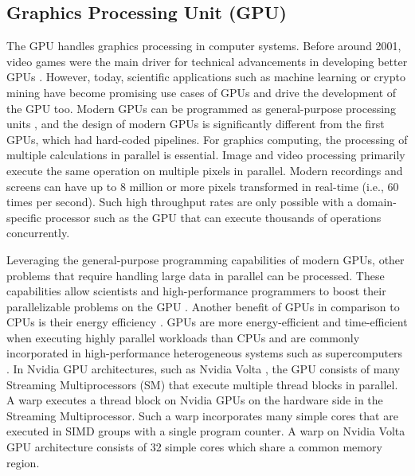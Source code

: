 \subsection{Graphics Processing Unit (GPU)}
The GPU handles graphics processing in computer systems. Before around 2001, video games were the main driver for technical advancements in developing better GPUs \cite{vuducBriefHistoryIntroduction2013}. However, today, scientific applications such as machine learning or crypto mining have become promising use cases of GPUs and drive the development of the GPU too. Modern GPUs can be programmed as general-purpose processing units \cite{nickollsGPUComputingEra2010}, and the design of modern GPUs is significantly different from the first GPUs, which had hard-coded pipelines. For graphics computing, the processing of multiple calculations in parallel is essential. Image and video processing primarily execute the same operation on multiple pixels in parallel. Modern recordings and screens can have up to 8 million or more pixels transformed in real-time (i.e., 60 times per second). Such high throughput rates are only possible with a domain-specific processor such as the GPU that can execute thousands of operations concurrently.

Leveraging the general-purpose programming capabilities of modern GPUs, other problems that require handling large data in parallel can be processed. These capabilities allow scientists and high-performance programmers to boost their parallelizable problems on the GPU \cite{cohenSolvingComputationalProblems2009,nickollsScalableParallelProgramming2008,stoneAcceleratingMolecularModeling2007}.
Another benefit of GPUs in comparison to CPUs is their energy efficiency \cite{qasaimehComparingEnergyEfficiency2019}. GPUs are more energy-efficient and time-efficient when executing highly parallel workloads than CPUs and are commonly incorporated in high-performance heterogeneous systems such as supercomputers \cite{dellGPUExpanseHPC2020}.
In Nvidia GPU architectures, such as Nvidia Volta \cite{NVIDIATESLAV1002017}, the GPU consists of many Streaming Multiprocessors (SM) that execute multiple thread blocks in parallel. A warp executes a thread block on Nvidia GPUs on the hardware side in the Streaming Multiprocessor. Such a warp incorporates many simple cores that are executed in SIMD groups with a single program counter. A warp on Nvidia Volta GPU architecture consists of 32 simple cores which share a common memory region.

